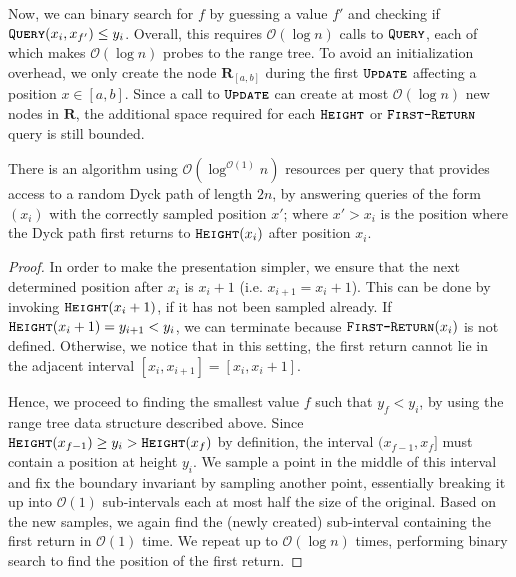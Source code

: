 Now, we can binary search for $f$ by guessing a value $f'$ and checking if $\texttt{\textsc{Query}}(x_i,x_{f'}) \le y_i$.
Overall, this requires $\mathcal O(\log n)$ calls to $\texttt{\textsc{Query}}$, each of which makes $\mathcal O(\log n)$ probes to the range tree.
To avoid an initialization overhead, we only create the node $\mathbf{R}_{[a,b]}$ during the first $\texttt{\textsc{Update}}$ affecting a position $x\in[a,b]$.
Since a call to $\texttt{\textsc{Update}}$ can create at most $\mathcal O(\log n)$ new nodes in $\mathbf R$,
the additional space required for each $\texttt{\textsc{Height}}$ or $\texttt{\textsc{First-Return}}$ query is still bounded.

\begin{theorem}
\label{thm:dyck_first_return_sampling}
There is an algorithm using $\mathcal O(\log^{\mathcal O(1)} n)$ resources per query that provides access to a random Dyck path of length $2n$,
by answering queries of the form $(x_i)$ with the correctly sampled position $x'$;
where $x'>x_i$ is the position where the Dyck path first returns to $\texttt{\textsc{Height}}(x_i)$ after position $x_i$.
\end{theorem}
\begin{proof}
In order to make the presentation simpler, we ensure that the next determined position after $x_i$ is $x_i+1$ (i.e. $x_{i+1} = x_i + 1$).
This can be done by invoking $\texttt{\textsc{Height}}(x_i+1)$, if it has not been sampled already.
If $\texttt{\textsc{Height}}(x_i+1) = y_{i+1} < y_i$, we can terminate because $\texttt{\textsc{First-Return}}(x_i)$ is not defined.
Otherwise, we notice that in this setting, the first return cannot lie in the adjacent interval $[x_i,x_{i+1}] = [x_i, x_i+1]$.

Hence, we proceed to finding the smallest value $f$ such that $y_f < y_i$, by using the range tree data structure described above.
Since $\texttt{\textsc{Height}}(x_{f-1}) \ge y_i > \texttt{\textsc{Height}}(x_f)$ by definition, the interval $(x_{f-1},x_f]$ must contain a position at height $y_i$.
We sample a point in the middle of this interval and fix the boundary invariant by sampling another point,
essentially breaking it up into $\mathcal O(1)$ sub-intervals each at most half the size of the original.
Based on the new samples, we again find the (newly created) sub-interval containing the first return in $\mathcal O(1)$ time.
We repeat up to $\mathcal O(\log n)$ times, performing binary search to find the position of the first return.
\end{proof}

